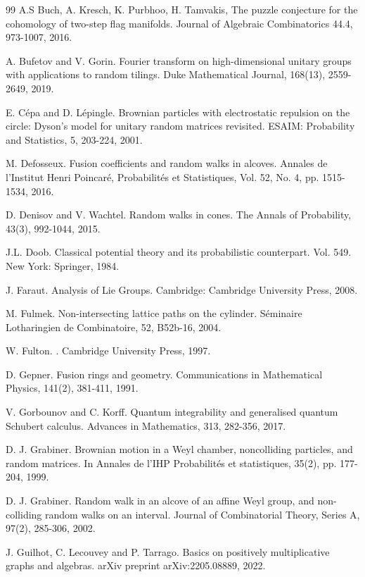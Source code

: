 \documentclass[10pt,11pt]{amsart}%
\begin{document}
\begin{thebibliography}{99}
A.S Buch, A. Kresch, K. Purbhoo, H. Tamvakis, The puzzle
conjecture for the cohomology of two-step flag manifolds. Journal of Algebraic
Combinatorics 44.4, 973-1007, 2016.

A. Bufetov and V. Gorin. Fourier transform on high-dimensional unitary groups with applications to random tilings. Duke Mathematical Journal, 168(13), 2559-2649, 2019.


E. Cépa and D. Lépingle. Brownian particles with electrostatic repulsion on the circle: Dyson's model for unitary random matrices revisited. ESAIM: Probability and Statistics, 5, 203-224, 2001.

M. Defosseux. Fusion coefficients and random walks in alcoves. 
Annales de l'Institut Henri Poincaré, Probabilités et Statistiques, Vol. 52, No. 4, pp. 1515-1534, 2016.

D. Denisov and V. Wachtel. Random walks in cones. The Annals of Probability, 43(3), 992-1044, 2015.


 J.L. Doob. 
Classical potential theory and its probabilistic counterpart. 
Vol. 549. New York: Springer, 1984.

 J. Faraut. Analysis of Lie Groups. Cambridge: Cambridge University Press, 2008.

M. Fulmek. Non-intersecting lattice paths on the cylinder. Séminaire Lotharingien de Combinatoire, 52, B52b-16, 2004.

W. Fulton. . \newblock
Cambridge University Press, 1997.

 D. Gepner. Fusion rings and geometry. Communications in Mathematical Physics, 141(2), 381-411, 1991.

 V. Gorbounov and C. Korff. Quantum integrability and generalised quantum Schubert calculus. Advances in Mathematics, 313, 282-356, 2017.

 D. J. Grabiner. Brownian motion in a Weyl chamber, noncolliding particles, and random matrices. In Annales de l'IHP Probabilités et statistiques, 35(2), pp. 177-204, 1999.

D. J. Grabiner. Random walk in an alcove of an affine Weyl group, and non-colliding random walks on an interval. Journal of Combinatorial Theory, Series A, 97(2), 285-306, 2002.


J. Guilhot, C. Lecouvey and P. Tarrago. Basics on positively multiplicative graphs and algebras. arXiv preprint arXiv:2205.08889, 2022.


\end{thebibliography}
\end{document}
